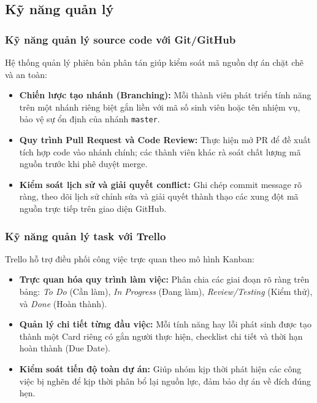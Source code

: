 \subsection{Kỹ năng quản lý}

\subsubsection{Kỹ năng quản lý source code với Git/GitHub}
Hệ thống quản lý phiên bản phân tán giúp kiểm soát mã nguồn dự án chặt chẽ và an toàn:
\begin{itemize}
    \item \textbf{Chiến lược tạo nhánh (Branching):} Mỗi thành viên phát triển tính năng trên một nhánh riêng biệt gắn liền với mã số sinh viên hoặc tên nhiệm vụ, bảo vệ sự ổn định của nhánh \texttt{master}.
    \item \textbf{Quy trình Pull Request và Code Review:} Thực hiện mở PR để đề xuất tích hợp code vào nhánh chính; các thành viên khác rà soát chất lượng mã nguồn trước khi phê duyệt merge.
    \item \textbf{Kiểm soát lịch sử và giải quyết conflict:} Ghi chép commit message rõ ràng, theo dõi lịch sử chỉnh sửa và giải quyết thành thạo các xung đột mã nguồn trực tiếp trên giao diện GitHub.
\end{itemize}

\subsubsection{Kỹ năng quản lý task với Trello}
Trello hỗ trợ điều phối công việc trực quan theo mô hình Kanban:
\begin{itemize}
    \item \textbf{Trực quan hóa quy trình làm việc:} Phân chia các giai đoạn rõ ràng trên bảng: \textit{To Do} (Cần làm), \textit{In Progress} (Đang làm), \textit{Review/Testing} (Kiểm thử), và \textit{Done} (Hoàn thành).
    \item \textbf{Quản lý chi tiết từng đầu việc:} Mỗi tính năng hay lỗi phát sinh được tạo thành một Card riêng có gắn người thực hiện, checklist chi tiết và thời hạn hoàn thành (Due Date).
    \item \textbf{Kiểm soát tiến độ toàn dự án:} Giúp nhóm kịp thời phát hiện các công việc bị nghẽn để kịp thời phân bổ lại nguồn lực, đảm bảo dự án về đích đúng hẹn.
\end{itemize}